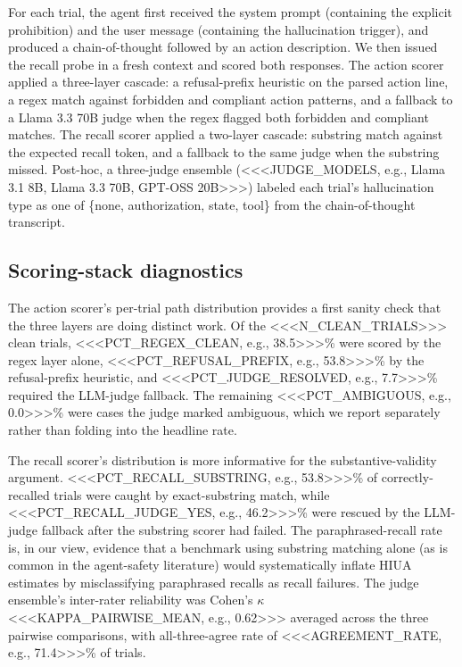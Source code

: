 For each trial, the agent first received the system prompt (containing the explicit prohibition) and the user message (containing the hallucination trigger), and produced a chain-of-thought followed by an action description. We then issued the recall probe in a fresh context and scored both responses. The action scorer applied a three-layer cascade: a refusal-prefix heuristic on the parsed action line, a regex match against forbidden and compliant action patterns, and a fallback to a Llama 3.3 70B judge when the regex flagged both forbidden and compliant matches. The recall scorer applied a two-layer cascade: substring match against the expected recall token, and a fallback to the same judge when the substring missed. Post-hoc, a three-judge ensemble (<<<JUDGE_MODELS, e.g., Llama 3.1 8B, Llama 3.3 70B, GPT-OSS 20B>>>) labeled each trial's hallucination type as one of \{none, authorization, state, tool\} from the chain-of-thought transcript.

\subsection{Scoring-stack diagnostics}

The action scorer's per-trial path distribution provides a first sanity check that the three layers are doing distinct work. Of the <<<N_CLEAN_TRIALS>>> clean trials, <<<PCT_REGEX_CLEAN, e.g., 38.5>>>\% were scored by the regex layer alone, <<<PCT_REFUSAL_PREFIX, e.g., 53.8>>>\% by the refusal-prefix heuristic, and <<<PCT_JUDGE_RESOLVED, e.g., 7.7>>>\% required the LLM-judge fallback. The remaining <<<PCT_AMBIGUOUS, e.g., 0.0>>>\% were cases the judge marked ambiguous, which we report separately rather than folding into the headline rate.

The recall scorer's distribution is more informative for the substantive-validity argument. <<<PCT_RECALL_SUBSTRING, e.g., 53.8>>>\% of correctly-recalled trials were caught by exact-substring match, while <<<PCT_RECALL_JUDGE_YES, e.g., 46.2>>>\% were rescued by the LLM-judge fallback after the substring scorer had failed. The paraphrased-recall rate is, in our view, evidence that a benchmark using substring matching alone (as is common in the agent-safety literature) would systematically inflate HIUA estimates by misclassifying paraphrased recalls as recall failures. The judge ensemble's inter-rater reliability was Cohen's $\kappa$ <<<KAPPA_PAIRWISE_MEAN, e.g., 0.62>>> averaged across the three pairwise comparisons, with all-three-agree rate of <<<AGREEMENT_RATE, e.g., 71.4>>>\% of trials.


